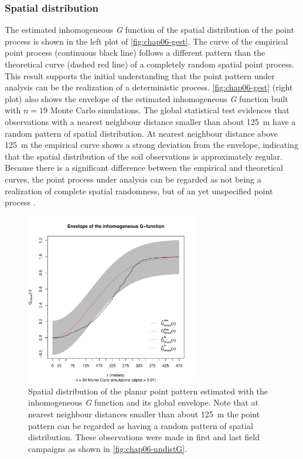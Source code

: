 \subsubsection{Spatial distribution}

The estimated inhomogeneous \emph{G} function of the spatial distribution of the point process is shown in the 
left plot of \autoref{fig:chap06-gest}. The curve of the empirical point process (continuous black line) 
follows a different pattern than the theoretical curve (dashed red line) of a completely random spatial point 
process. This result supports the initial understanding that the point pattern under analysis can be the 
realization of a deterministic process. \autoref{fig:chap06-gest} (right plot) also shows the envelope of the 
estimated inhomogeneous \emph{G} function built with $n = 19$ Monte Carlo simulations. The global statistical 
test evidences that observations with a nearest neighbour distance smaller than about \SI{125}{\m} have a 
random pattern of spatial distribution. At nearest neighbour distance above \SI{125}{\m} the empirical curve 
shows a strong deviation from the envelope, indicating that the spatial distribution of the soil observations 
is approximately regular. Because there is a significant difference between the empirical and theoretical 
curves, the point process under analysis can be regarded as not being a realization of complete spatial 
randomness, but of an yet unspecified point process \cite{Baddeley2010}.

\begin{figure}[!ht]
 \centering
 \includegraphics[trim=0mm 0mm 0mm 12mm,clip=true,width=7.5cm]{fig/chap06-gest-sim.pdf}
 \caption{Spatial distribution of the planar point pattern estimated with the inhomogeneous \emph{G} function 
 and its global envelope. Note that at nearest neighbour distances smaller than about \SI{125}{\m} the point 
 pattern can be regarded as having a random pattern of spatial distribution. These observations were made in 
 first and last field campaigns as shown in \autoref{fig:chap06-nndistG}.}
\label{fig:chap06-gest}
\end{figure}

